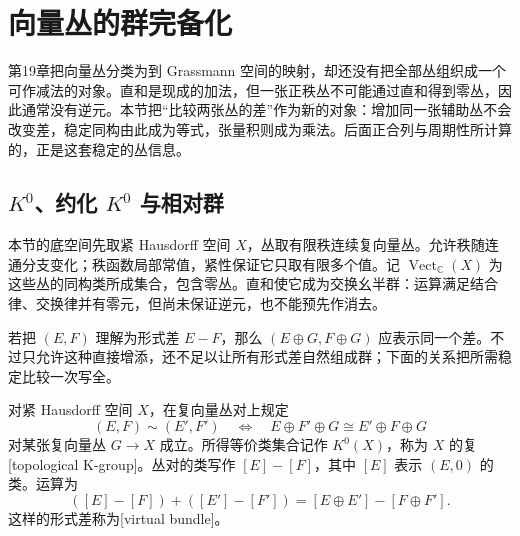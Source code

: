 
% 
% 

\section{向量丛的群完备化}
\label{g2:sec:2401}

第19章把向量丛分类为到 Grassmann 空间的映射，却还没有把全部丛组织成一个可作减法的对象。直和是现成的加法，但一张正秩丛不可能通过直和得到零丛，因此通常没有逆元。本节把“比较两张丛的差”作为新的对象：增加同一张辅助丛不会改变差，稳定同构由此成为等式，张量积则成为乘法。后面正合列与周期性所计算的，正是这套稳定的丛信息。

\subsection{\texorpdfstring{\(K^0\)、约化 \(K^0\) 与相对群}{K⁰、约化 K⁰ 与相对群}}
\label{g2:subsec:2401:01}
本节的底空间先取紧 Hausdorff 空间 \(X\)，丛取有限秩连续复向量丛。允许秩随连通分支变化；秩函数局部常值，紧性保证它只取有限多个值。记 \(\operatorname{Vect}_{\mathbb C}(X)\) 为这些丛的同构类所成集合，包含零丛。直和使它成为交换幺半群：运算满足结合律、交换律并有零元，但尚未保证逆元，也不能预先作消去。

若把 \((E,F)\) 理解为形式差 \(E-F\)，那么 \((E\oplus G,F\oplus G)\) 应表示同一个差。不过只允许这种直接增添，还不足以让所有形式差自然组成群；下面的关系把所需稳定比较一次写全。

\begin{definition}\label{g2:def:topological-k-zero}
	对紧 Hausdorff 空间 \(X\)，在复向量丛对上规定
	\[
		(E,F)\sim(E',F')
		\quad\Longleftrightarrow\quad
		E\oplus F'\oplus G\cong E'\oplus F\oplus G
	\]
	对某张复向量丛 \(G\to X\) 成立。所得等价类集合记作 \(K^0(X)\)，称为 \(X\) 的复[topological K-group]。丛对的类写作 \([E]-[F]\)，其中 \([E]\) 表示 \((E,0)\) 的类。运算为
	\[
		([E]-[F])+([E']-[F'])=[E\oplus E']-[F\oplus F'].
	\]
	这样的形式差称为[virtual bundle]。
\end{definition}

